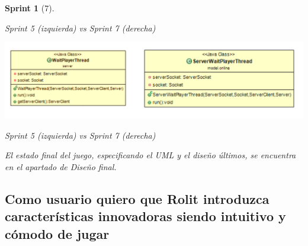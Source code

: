\documentclass[12pt,a4paper,openright]{book}
\theoremstyle{break}
\newtheorem*{sprint}{Sprint}
\begin{document}
\begin{sprint}[7]
\begin{center}
Sprint 5 (izquierda) vs Sprint 7 (derecha)
\end{center}

\begin{center}
\includegraphics[scale=0.3]{WaitPlayerThread-evol.png} 

Sprint 5 (izquierda) vs Sprint 7 (derecha)
\end{center}

El estado final del juego, especificando el UML y el diseño últimos, se encuentra en el apartado de Diseño final.

\end{sprint}

\newpage

\subsection{Como usuario quiero que Rolit introduzca características innovadoras siendo intuitivo y cómodo de jugar}
\end{document}
